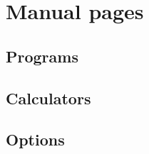 \chapter{Manual pages}

\section{Programs}
\label{ref:programs}


\section{Calculators}
\label{ref:calculators}


\section{Options}
\label{ref:options}


